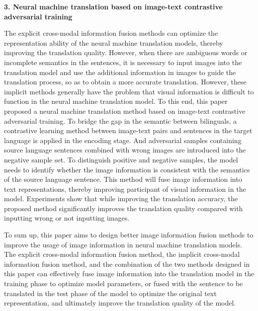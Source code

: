 \textbf{3. Neural machine translation based on image-text contrastive adversarial training}

The explicit cross-modal information fusion methods can optimize the representation ability of the neural machine translation models, thereby improving the translation quality. However, when there are ambiguous words or incomplete semantics in the sentences, it is necessary to input images into the translation model and use the additional information in images to guide the translation process, so as to obtain a more accurate translation. However, these implicit methods generally have the problem that visual information is difficult to function in the neural machine translation model. To this end, this paper proposed a neural machine translation method based on image-text contrastive adversarial training. To bridge the gap in the semantic between bilinguals, a contrastive learning method between image-text pairs and sentences in the target language is applied in the encoding stage. And adversarial samples containing source language sentences combined with wrong images are introduced into the negative sample set. To distinguish positive and negative samples, the model needs to identify whether the image information is consistent with the semantics of the source language sentence. This method will fuse image information into text representations, thereby improving participant of visual information in the model. Experiments show that while improving the translation accuracy, the proposed method significantly improves the translation quality compared with inputting wrong or not inputting images.

To sum up, this paper aims to design better image information fusion methods to improve the usage of image information in neural machine translation models. The explicit cross-modal information fusion method, the implicit cross-modal information fusion method, and the combination of the two methods designed in this paper can effectively fuse image information into the translation model in the training phase to optimize model parameters, or fused with the sentence to be translated in the test phase of the model to optimize the original text representation, and ultimately improve the translation quality of the model.

